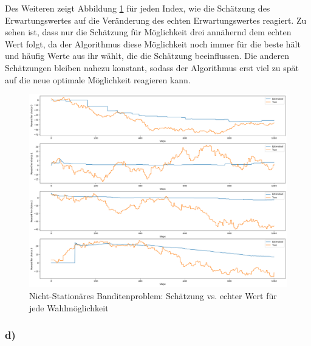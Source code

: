 \documentclass[11pt]{article}
\begin{document}
Des Weiteren zeigt Abbildung \ref{img:1_2c2} für jeden Index, wie die Schätzung des Erwartungswertes auf die Veränderung des echten Erwartungswertes reagiert. Zu sehen ist, dass nur die Schätzung für Möglichkeit drei annähernd dem echten Wert folgt, da der Algorithmus diese Möglichkeit noch immer für die beste hält und häufig Werte aus ihr wählt, die die Schätzung beeinflussen. Die anderen Schätzungen bleiben nahezu konstant, sodass der Algorithmus erst viel zu spät auf die neue optimale Möglichkeit reagieren kann.

\begin{figure}[h]
    \centering
    \includegraphics[width=\textwidth]{img/1_2c2.png}
    \caption{Nicht-Stationäres Banditenproblem: Schätzung vs. echter Wert für jede Wahlmöglichkeit}
    \label{img:1_2c2}
\end{figure}
\subsubsection*{d)}
\end{document}
